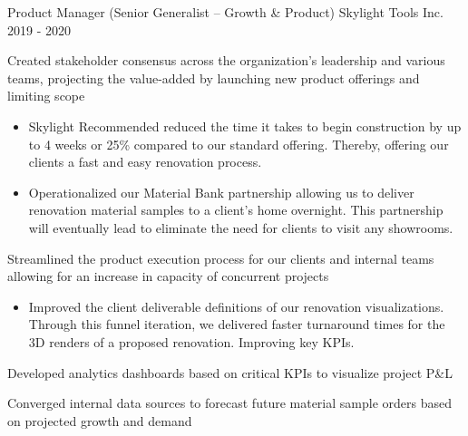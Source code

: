 \begin{cventries}

  \cventry
    {Product Manager (Senior Generalist – Growth \& Product)} %
    {Skylight Tools Inc.} %
    {} %
    {2019 - 2020} %
    {
    \begin{cvitems} %
        \item {Created stakeholder consensus across the organization’s leadership and various teams, projecting the value-added by launching new product offerings and limiting scope
            \begin{itemize}
                \item {Skylight Recommended reduced the time it takes to begin construction by up to 4 weeks or 25\% compared to our standard offering. Thereby, offering our clients a fast and easy renovation process.}
                \item {Operationalized our Material Bank partnership allowing us to deliver renovation material samples to a client’s home overnight.
                \newline This partnership will eventually lead to eliminate the need for clients to visit any showrooms.}
            \end{itemize}
        \item {Streamlined the product execution process for our clients and internal teams allowing for an increase in capacity of concurrent projects
            \begin{itemize}
                \item {Improved the client deliverable definitions of our renovation visualizations. Through this funnel iteration, we delivered faster turnaround times for the 3D renders of a proposed renovation. Improving key KPIs.}
            \end{itemize}}
        \item {Developed analytics dashboards based on critical KPIs to visualize project P\&L}
        \item {Converged internal data sources to forecast future material sample orders based on projected growth and demand}}

\end{cvitems}}
\end{cventries}
